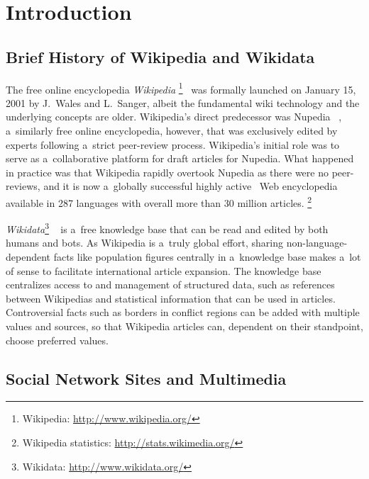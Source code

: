 \documentclass{sig-alternate}
\newcommand{\inlinelistingsize}{\fontsize{8pt}{11pt}}
\let\oldurl\url
\renewcommand{\url}[1]{\inlinelistingsize\oldurl{#1}}
\begin{document}



\section{Introduction}
\selectfont

\subsection{Brief History of Wikipedia and Wikidata}

The free online encyclopedia \emph{Wikipedia}%
\footnote{Wikipedia: \url{http://www.wikipedia.org/}}~\cite{sanger05historywikipedia} was formally launched
on January 15, 2001 by J.~Wales
and L.~Sanger,
albeit the fundamental wiki technology
and the underlying concepts are older.
Wikipedia's direct predecessor was Nupedia%
~\cite{sanger05historywikipedia},
a~similarly free online encyclopedia,
however, that was exclusively edited by experts
following a~strict peer-review process.
Wikipedia's initial role was to serve
as a~collaborative platform for draft articles for Nupedia.
What happened in practice was that Wikipedia
rapidly overtook Nupedia as there were no peer-reviews,
and it is now a~globally successful
highly active~\cite{steiner2013bots} Web encyclopedia
available in 287 languages with overall
more than 30 million articles.%
\footnote{Wikipedia statistics: \url{http://stats.wikimedia.org/}}

\emph{Wikidata}\footnote{Wikidata: \url{http://www.wikidata.org/}}%
~\cite{vrandecic2012wikidata}
is a~free knowledge base that can be read
and edited by both humans and bots.
As Wikipedia is a~truly global effort,
sharing non-language-dependent facts
like population figures centrally
in a~knowledge base makes a~lot of sense
to facilitate international article expansion.
The knowledge base centralizes access to
and management of structured data,
such as references between Wikipedias
and statistical information that can be used in articles.
Controversial facts such as borders in conflict regions
can be added with multiple values and sources,
so that Wikipedia articles can,
dependent on their standpoint, choose preferred values.

\subsection{Social Network Sites and Multimedia}
\end{document}
